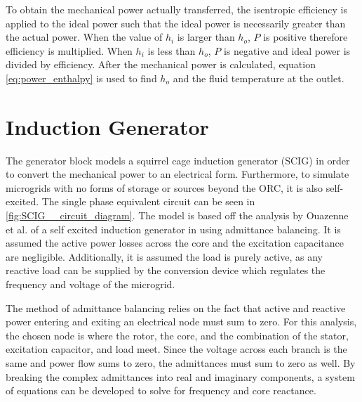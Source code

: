 To obtain the mechanical power actually transferred, the isentropic efficiency is applied to the ideal power such that the ideal power is necessarily greater than the actual power. When the value of $h_i$ is larger than $h_o$, $P$ is positive therefore efficiency is multiplied. When $h_i$ is less than $h_o$, $P$ is negative and ideal power is divided by efficiency. After the mechanical power is calculated, equation \ref{eq:power_enthalpy} is used to find $h_o$ and the fluid temperature at the outlet. 

\section{Induction Generator}
The generator block models a squirrel cage induction generator (SCIG) in order to convert the mechanical power to an electrical form. Furthermore, 
to simulate microgrids with no forms of storage or sources beyond the ORC, it is also self-excited. The single phase equivalent circuit %
can be seen in \autoref{fig:SCIG__circuit_diagram}.
The model is based off the analysis by Ouazenne et al. of a self excited induction generator in \cite{Ouazenne1983} using admittance balancing. It is assumed the active power losses across the core and the excitation capacitance are negligible. Additionally, it is assumed the load is purely active, as any reactive load can be supplied by the conversion device which regulates the frequency and voltage of the microgrid.

The method of admittance balancing relies on the fact that active and reactive power entering and exiting an electrical node must sum to zero. For this analysis, the chosen node is where the rotor, the core, and the combination of the stator, excitation capacitor, and load meet. Since the voltage across each branch is the same and power flow sums to zero, the admittances must sum to zero as well. By breaking the complex admittances into real and imaginary components, a system of equations can be developed to solve for frequency and core reactance. 

